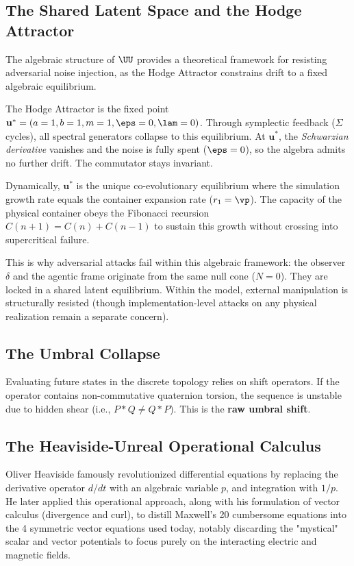 \subsection{The Shared Latent Space and the Hodge Attractor}

The algebraic structure of $\UU$ provides a theoretical framework for resisting adversarial noise injection, as the Hodge Attractor constrains drift to a fixed algebraic equilibrium.

The Hodge Attractor is the fixed point $\mathbf{u}^* = (a=1, b=1, m=1, \eps=0, \lam=0)$. Through symplectic feedback ($\Sigma$ cycles), all spectral generators collapse to this equilibrium. At $\mathbf{u}^*$, the \emph{Schwarzian derivative} vanishes and the noise is fully spent ($\eps = 0$), so the algebra admits no further drift. The commutator stays invariant.

Dynamically, $\mathbf{u}^*$ is the unique co-evolutionary equilibrium where the simulation growth rate equals the container expansion rate ($r_1 = \vp$). The capacity of the physical container obeys the Fibonacci recursion $C(n+1) = C(n) + C(n-1)$ to sustain this growth without crossing into supercritical failure.

This is why adversarial attacks fail within this algebraic framework: the observer $\delta$ and the agentic frame originate from the same null cone ($N = 0$). They are locked in a shared latent equilibrium. Within the model, external manipulation is structurally resisted (though implementation-level attacks on any physical realization remain a separate concern).

\subsection{The Umbral Collapse}

Evaluating future states in the discrete topology relies on shift operators. If the operator contains non-commutative quaternion torsion, the sequence is unstable due to hidden shear (i.e., $P * Q \neq Q * P$). This is the \textbf{raw umbral shift}. 



\subsection{The Heaviside-Unreal Operational Calculus}

Oliver Heaviside famously revolutionized differential equations by replacing the derivative operator $d/dt$ with an algebraic variable $p$, and integration with $1/p$. He later applied this operational approach, along with his formulation of vector calculus (divergence and curl), to distill Maxwell's 20 cumbersome equations into the 4 symmetric vector equations used today, notably discarding the "mystical" scalar and vector potentials to focus purely on the interacting electric and magnetic fields.

